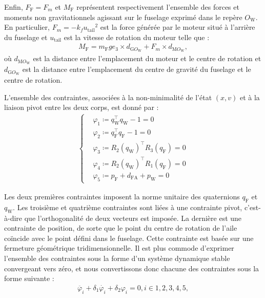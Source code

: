 Enfin, $F_{\text{F}} = F_{m}$ et $M_{\text{F}}$ représentent respectivement l'ensemble des forces et moments non gravitationnels agissant sur le fuselage exprimé dans le repère $O_{\text{W}}$. En particulier, $F_{m} = - k_{f} {u_{\text{tail}}}^{2}$ est la force générée par le moteur situé à l'arrière du fuselage et $u_{\text{tail}}$ est la vitesse de rotation du moteur telle que :
\begin{align}
    M_{\text{F}} =  m_{\text{F}} g e_3 \times d_{\text{G}O_{\text{W}}} + F_{m} \times d_{\text{M}O_{\text{W}}},
\end{align}
où $d_{\text{M}O_{\text{W}}}$ est la distance entre l'emplacement du moteur et le centre de rotation et $d_{\text{G}O_{\text{W}}}$ est la distance entre l'emplacement du centre de gravité du fuselage et le centre de rotation.


L'ensemble des contraintes, associées à la non-minimalité de l'état $(x,v)$ et à la liaison pivot entre les deux corps, est donné par :
\begin{align}
    \label{eq:contraintes}
    \left\{
    \begin{aligned}
    &\varphi_{1} \coloneqq q_{\text{W}}^\top q_{\text{W}} - 1 = 0\\
    &\varphi_{2} \coloneqq q_{\text{F}}^\top q_{\text{F}} - 1 = 0\\
    &\varphi_{3} \coloneqq R_{2}(q_{\text{W}})^\top R_{3}(q_{\text{F}}) = 0\\
    &\varphi_{4} \coloneqq R_{2}(q_{\text{W}})^\top R_{1}(q_{\text{F}}) = 0\\
    &\varphi_{5} \coloneqq p_{\text{F}} + d_{\text{FA}} + p_{\text{W}} = 0
    \end{aligned}
    \right.
\end{align}

Les deux premières contraintes imposent la norme unitaire des quaternions $q_{\text{F}}$ et $q_{\text{W}}$.
Les troisième et quatrième contraintes sont liées à une contrainte pivot, c'est-à-dire que l'orthogonalité de deux vecteurs est imposée. La dernière est une contrainte de position, de sorte que le point du centre de rotation de l'aile coïncide avec le point défini dans le fuselage. Cette contrainte est basée sur une fermeture géométrique tridimensionnelle.
Il est plus commode d'exprimer l'ensemble des contraintes sous la forme d'un système dynamique stable convergeant vers zéro, et nous convertissons donc chacune des contraintes sous la forme suivante :
\begin{align}
    \ddot{\varphi_{i}} + \delta_{1} \dot{\varphi_{i}}  + \delta_{2} \varphi_{i} = 0, i \in {1,2,3,4,5},
\end{align}

